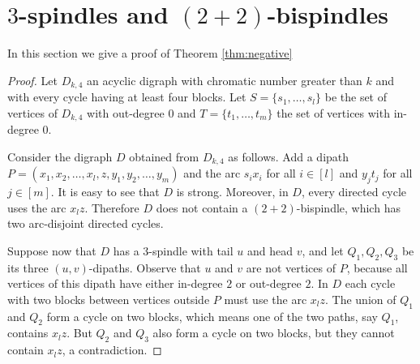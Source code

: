 \documentclass{endm}
\begin{document}
\section{$3$-spindles and $(2+2)$-bispindles}




In this section we give a proof of Theorem \ref{thm:negative}

\begin{proof}
Let $D_{k,4}$ an acyclic digraph with chromatic number greater than $k$ and with every cycle having at least four blocks.
Let $S = \{s_1, \dots,  s_l\}$ be the set of vertices of $D_{k,4}$ with out-degree 0 and $T = \{t_1, \dots, t_m\}$ the set of vertices with in-degree 0.

Consider the digraph $D$ obtained from $D_{k,4}$ as follows. Add a dipath  $P = (x_1,x_2, \dots , x_l,z,y_1,y_2,\dots, y_m)$ and the arc $s_ix_i$ for all $i\in [l]$ and
$y_jt_j$ for all $j\in [m]$. It is easy to see that $D$ is strong.
Moreover, in $D$, every directed cycle uses the arc $x_lz$. Therefore $D$ does not contain a $(2+2)$-bispindle, which has two arc-disjoint directed cycles. 

Suppose now that $D$ has a $3$-spindle with tail $u$ and head $v$, and let $Q_1, Q_2, Q_3$ be its three $(u,v)$-dipaths. Observe that $u$ and $v$ are not vertices of $P$, because all vertices of this dipath have either in-degree $2$ or out-degree $2$. In $D$ each cycle with two blocks between vertices outside $P$ must use the arc $x_lz$. The union of $Q_1$ and $Q_2$ form a cycle on two blocks, 
which means one of the two paths, say $Q_1$, contains $x_lz$. But $Q_2$ and $Q_3$ also form a cycle on two blocks, but they cannot contain $x_lz$, a contradiction.
\end{proof}
\end{document}
